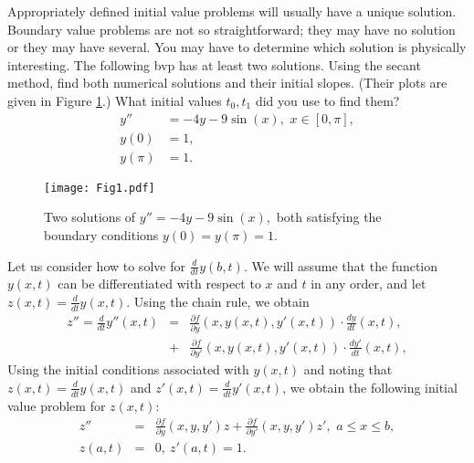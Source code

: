 
\begin{problem}
Appropriately defined initial value problems will usually have a unique solution.
Boundary value problems are not so straightforward; they may have no solution or they may have several.
You may have to determine which solution is physically interesting.
The following bvp has at least two solutions.
Using the secant method, find both numerical solutions and their initial slopes.
(Their plots are given in Figure \ref{prob:shooting1}.)
What initial values $t_0, t_1$ did you use to find them?
\begin{equation*}
\begin{split}
y'' &= -4y -9\sin(x), \,\, x \in [0,\pi],\\
y(0) &= 1, \\
y(\pi) &=1.
\end{split}
\end{equation*}

\begin{figure}[H]
\texttt{[image: Fig1.pdf]}
\caption{Two solutions of $y'' = -4y -9\sin(x),$ both satisfying the boundary conditions $y(0) = y(\pi) = 1.$}
\label{prob:shooting1}
\end{figure}
\end{problem}

Let us consider how to solve for $\frac{d}{dt} y(b,t)$.
We will assume that the function $y(x,t)$ can be differentiated with respect to $x$ and $t$ in any order, and let  $z(x,t) = \frac{d}{dt} y(x,t).$
Using the chain rule, we obtain
\begin{eqnarray*}
z'' = \frac{d}{dt} y''(x,t) &=& \frac{\partial f}{\partial y} (x,y(x,t),y'(x,t)) \cdot \frac{dy}{dt}(x,t) ,\\
&+& \frac{\partial f}{\partial y'} (x,y(x,t),y'(x,t)) \cdot \frac{dy'}{dt}(x,t),
\end{eqnarray*}
Using the initial conditions associated with $y(x,t)$ and noting that $z(x, t) = \frac{d}{dt}y(x, t)$ and $z'(x, t) = \frac{d}{dt}y'(x, t)$, we obtain the following initial value problem for $z(x,t)$:
\begin{eqnarray*}
z'' &=& \frac{\partial f}{\partial y} (x,y,y') z + \frac{\partial f}{\partial y'} (x,y,y') z'
,\,\,a \leq x \leq b, \\
 z(a, t) &=& 0,\ z'(a, t) = 1.
\end{eqnarray*}

